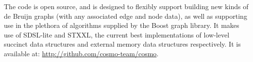 The code is open source, and is designed to flexibly support building new kinds of de Bruijn graphs (with any associated
edge and node data), as well as supporting use in the plethora of algorithms supplied by the Boost graph library. It makes
use of SDSL-lite and STXXL, the current best implementations of low-level succinct data structures and external memory
data structures respectively. It is available at: \url{http://github.com/cosmo-team/cosmo}.
